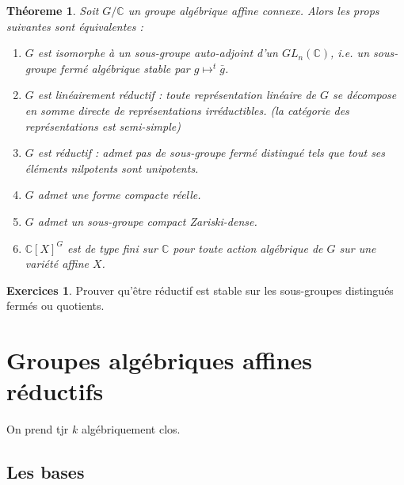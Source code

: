 \documentclass[a4paper,12pt]{book}
\newcommand{\C}{\mathbb{C}}
\theoremstyle{plain}
\newtheorem{thm}[subsection]{Théoreme}
\theoremstyle{definition}
\newtheorem{exo}[subsection]{Exercices}
\theoremstyle{remark}
\begin{document}
\begin{thm}
  Soit $G/\C$ un groupe algébrique affine connexe. Alors 
  les props suivantes sont équivalentes :
  \begin{enumerate}
    \item $G$ est isomorphe à un sous-groupe auto-adjoint
      d'un $GL_n(\C)$, i.e. un sous-groupe fermé algébrique
      stable par $g\mapsto ^t\bar g$.
    \item $G$ est linéairement réductif : toute représentation
      linéaire de $G$ se décompose en somme directe de 
      représentations irréductibles. (la catégorie des 
      représentations est semi-simple)
    \item $G$ est réductif : admet pas de sous-groupe fermé
      distingué tels que tout ses éléments nilpotents sont
      unipotents.
    \item $G$ admet une forme compacte réelle.
    \item $G$ admet un sous-groupe compact Zariski-dense.
    \item $\C[X]^G$ est de type fini sur $\C$ pour toute action
      algébrique de $G$ sur une variété affine $X$.
  \end{enumerate}
\end{thm}
\begin{exo}
  Prouver qu'être réductif est stable sur les sous-groupes
  distingués fermés ou quotients.
\end{exo}
\chapter{Groupes algébriques affines réductifs}
On prend tjr $k$ algébriquement clos.
\section{Les bases}
\end{document}
